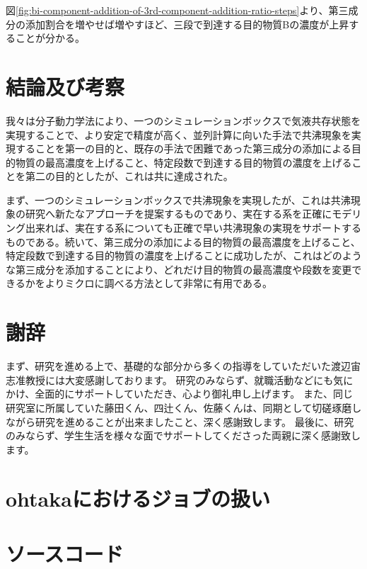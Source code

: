 \documentclass[titlepage]{jsreport}
\begin{document}
図\ref{fig:bi-component-addition-of-3rd-component-addition-ratio-steps}より、第三成分の添加割合を増やせば増やすほど、三段で到達する目的物質Bの濃度が上昇することが分かる。


\chapter{結論及び考察} \label{chap:summary}
我々は分子動力学法により、一つのシミュレーションボックスで気液共存状態を実現することで、より安定で精度が高く、並列計算に向いた手法で共沸現象を実現することを第一の目的と、既存の手法で困難であった第三成分の添加による目的物質の最高濃度を上げること、特定段数で到達する目的物質の濃度を上げることを第二の目的としたが、これは共に達成された。

まず、一つのシミュレーションボックスで共沸現象を実現したが、これは共沸現象の研究へ新たなアプローチを提案するものであり、実在する系を正確にモデリング出来れば、実在する系についても正確で早い共沸現象の実現をサポートするものである。続いて、第三成分の添加による目的物質の最高濃度を上げること、特定段数で到達する目的物質の濃度を上げることに成功したが、これはどのような第三成分を添加することにより、どれだけ目的物質の最高濃度や段数を変更できるかをよりミクロに調べる方法として非常に有用である。


\chapter*{謝辞}
まず、研究を進める上で、基礎的な部分から多くの指導をしていただいた渡辺宙志准教授には大変感謝しております。
研究のみならず、就職活動などにも気にかけ、全面的にサポートしていただき、心より御礼申し上げます。
また、同じ研究室に所属していた藤田くん、四辻くん、佐藤くんは、同期として切磋琢磨しながら研究を進めることが出来ましたこと、深く感謝致します。
最後に、研究のみならず、学生生活を様々な面でサポートしてくださった両親に深く感謝致します。

\appendix
\chapter{ohtakaにおけるジョブの扱い}


\chapter{ソースコード}






\end{document}
